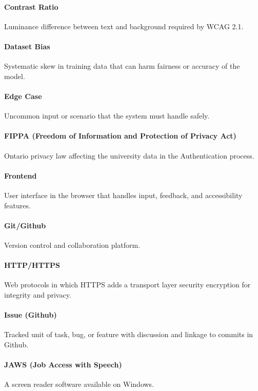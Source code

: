 \documentclass[12pt]{article}
\begin{document}
\paragraph*{Contrast Ratio}
Luminance difference between text and background required by WCAG 2.1.

\paragraph*{Dataset Bias}
Systematic skew in training data that can harm fairness or accuracy of the model.

\paragraph*{Edge Case}
Uncommon input or scenario that the system must handle safely.

\paragraph*{FIPPA (Freedom of Information and Protection of Privacy Act)}
Ontario privacy law affecting the university data in the Authentication process.

\paragraph*{Frontend}
User interface in the browser that handles input, feedback, and accessibility features.

\paragraph*{Git/Github}
Version control and collaboration platform. 

\paragraph*{HTTP/HTTPS}
Web protocols in which HTTPS adds a transport layer security encryption for integrity and privacy.

\paragraph*{Issue (Github)}
Tracked unit of task, bug, or feature with discussion and linkage to commits in Github.

\paragraph*{JAWS (Job Access with Speech)}
A screen reader software available on Windows.
\end{document}
